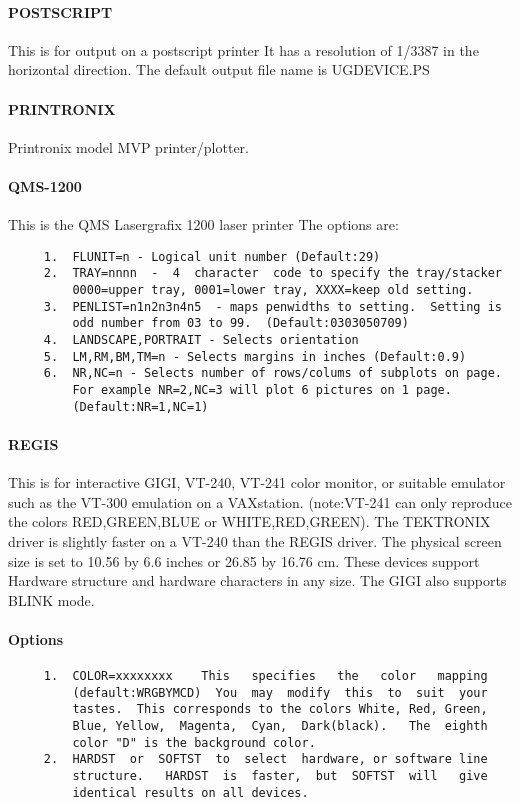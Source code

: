 \paragraph{POSTSCRIPT}
This  is  for  output  on a postscript printer It has a resolution of
1/3387 in the horizontal direction.  The default output file name  is
UGDEVICE.PS 
\paragraph{PRINTRONIX}
Printronix model MVP printer/plotter.  
\paragraph{QMS-1200}
This is the QMS Lasergrafix 1200 laser printer The options are:  
\begin{verbatim}
     1.  FLUNIT=n - Logical unit number (Default:29) 
     2.  TRAY=nnnn  -  4  character  code to specify the tray/stacker
         0000=upper tray, 0001=lower tray, XXXX=keep old setting.  
     3.  PENLIST=n1n2n3n4n5  - maps penwidths to setting.  Setting is
         odd number from 03 to 99.  (Default:0303050709) 
     4.  LANDSCAPE,PORTRAIT - Selects orientation 
     5.  LM,RM,BM,TM=n - Selects margins in inches (Default:0.9) 
     6.  NR,NC=n - Selects number of rows/colums of subplots on page.
         For example NR=2,NC=3 will plot 6 pictures on 1 page.  
         (Default:NR=1,NC=1) 
\end{verbatim}
\paragraph{REGIS}
This  is  for  interactive  GIGI,  VT-240,  VT-241  color monitor, or
suitable emulator such as  the  VT-300  emulation  on  a  VAXstation.
(note:VT-241   can   only  reproduce  the  colors  RED,GREEN,BLUE  or
WHITE,RED,GREEN).  The TEKTRONIX  driver  is  slightly  faster  on  a
VT-240  than  the  REGIS  driver.  The physical screen size is set to
10.56 by 6.6 inches or 26.85 by  16.76  cm.   These  devices  support
Hardware  structure  and  hardware  characters in any size.  The GIGI
also supports BLINK mode.  

\paragraph{Options}
\begin{verbatim}
     1.  COLOR=xxxxxxxx    This   specifies   the   color   mapping
         (default:WRGBYMCD)  You  may  modify  this  to  suit  your
         tastes.  This corresponds to the colors White, Red, Green,
         Blue, Yellow,  Magenta,  Cyan,  Dark(black).   The  eighth
         color "D" is the background color.  
     2.  HARDST  or  SOFTST  to  select  hardware, or software line
         structure.   HARDST  is  faster,  but  SOFTST  will   give
         identical results on all devices.  
\end{verbatim}

